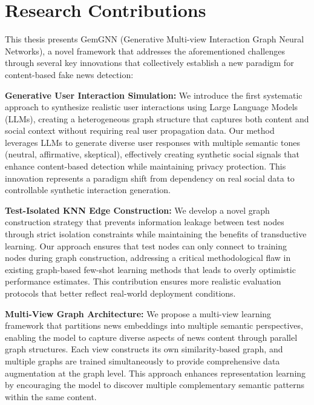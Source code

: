 \section{Research Contributions}

This thesis presents GemGNN (Generative Multi-view Interaction Graph Neural Networks), a novel framework that addresses the aforementioned challenges through several key innovations that collectively establish a new paradigm for content-based fake news detection:


\textbf{Generative User Interaction Simulation:} We introduce the first systematic approach to synthesize realistic user interactions using Large Language Models (LLMs), creating a heterogeneous graph structure that captures both content and social context without requiring real user propagation data. Our method leverages LLMs to generate diverse user responses with multiple semantic tones (neutral, affirmative, skeptical), effectively creating synthetic social signals that enhance content-based detection while maintaining privacy protection. This innovation represents a paradigm shift from dependency on real social data to controllable synthetic interaction generation.


\textbf{Test-Isolated KNN Edge Construction:} We develop a novel graph construction strategy that prevents information leakage between test nodes through strict isolation constraints while maintaining the benefits of transductive learning. Our approach ensures that test nodes can only connect to training nodes during graph construction, addressing a critical methodological flaw in existing graph-based few-shot learning methods that leads to overly optimistic performance estimates. This contribution ensures more realistic evaluation protocols that better reflect real-world deployment conditions.

\textbf{Multi-View Graph Architecture:} We propose a multi-view learning framework that partitions news embeddings into multiple semantic perspectives, enabling the model to capture diverse aspects of news content through parallel graph structures. Each view constructs its own similarity-based graph, and multiple graphs are trained simultaneously to provide comprehensive data augmentation at the graph level. This approach enhances representation learning by encouraging the model to discover multiple complementary semantic patterns within the same content.

